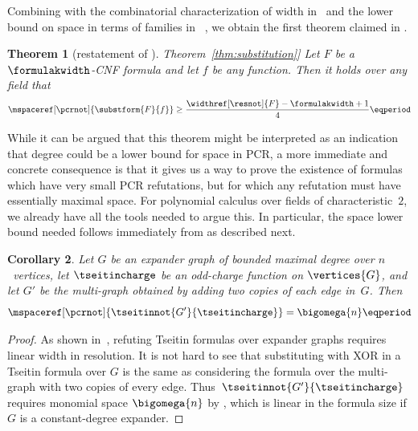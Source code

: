 \documentclass[11pt]{article}
\numberwithin{equation}{section}
\newtheorem{theorem}{Theorem}[section]
\newtheorem{corollary}[theorem]{Corollary}
\theoremstyle{definition}
\theoremstyle{plain}
\newcommand{\expref}[2]{\hyperref[#2]{#1~\ref{#2}}}
\begin{document}
Combining 
with the combinatorial characterization of width in~%
and the lower bound on space in terms of \kextendibleNok families in~%
,
we obtain the first theorem claimed in 
.


%
%
%
%
\begin{theorem}[restatement of \expref{Theorem}{thm:substitution}]
%
  Let $F$ be a $\formulakwidth$-CNF formula and let $f$ be any
  \nonauthor{} function. Then
  it holds over any field that %
  \begin{equation*}
    \mspaceref[\pcrnot]{\substform{F}{f}} 
    \geq 
    \frac{\widthref[\resnot]{F} - \formulakwidth + 1}{4} \eqperiod
  \end{equation*}
%
\end{theorem}

While it can be argued that this theorem might be interpreted as an
indication that degree could be a lower bound for space in PCR, a more
immediate and concrete consequence is that 
it gives us a way to prove the existence of formulas which have very
small PCR refutations, but for which any refutation must
have essentially maximal space. 
%
For polynomial calculus over fields of characteristic~$2$, we already
have all the tools needed to argue this. In particular, 
the space lower bound needed
follows immediately from
as described next.

\begin{corollary}\label{cor:tseitin-double}
  Let $G$ be
%
%
  an expander graph of bounded maximal %
  degree over $n$~vertices,
  let
  $\tseitincharge$ be an odd-charge function on 
  $\vertices{G}$,
  and let $G'$ be 
  the multi-graph obtained by adding two copies of each edge in~$G$.
%
  Then
  \begin{equation*}
    \mspaceref[\pcrnot]{\tseitinnot{G'}{\tseitincharge}} =
    \bigomega{n}
    \eqperiod
  \end{equation*}
\end{corollary}
\begin{proof}
  As shown in~\cite{BW01ShortProofs},
  refuting Tseitin formulas over expander graphs requires linear width
  in resolution. It is not hard to see that substituting with XOR in a
  Tseitin formula over $G$ is the same as considering 
  the formula over the multi-graph with two copies of every edge.
  Thus~$\tseitinnot{G'}{\tseitincharge}$ requires monomial space
  $\bigomega{n}$ 
  by
 ,
  which is linear in the formula size if $G$ is a constant-degree expander.
\end{proof}
\end{document}
